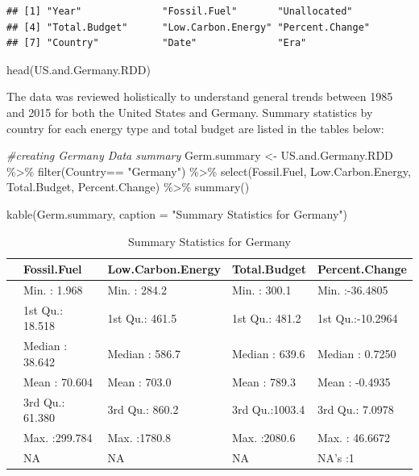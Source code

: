 \documentclass[
  12pt,
]{article}
\newenvironment{Shaded}{\begin{snugshade}}{\end{snugshade}}
\newcommand{\AttributeTok}[1]{\textcolor[rgb]{0.77,0.63,0.00}{#1}}
\newcommand{\CommentTok}[1]{\textcolor[rgb]{0.56,0.35,0.01}{\textit{#1}}}
\newcommand{\FunctionTok}[1]{\textcolor[rgb]{0.00,0.00,0.00}{#1}}
\newcommand{\NormalTok}[1]{#1}
\newcommand{\OtherTok}[1]{\textcolor[rgb]{0.56,0.35,0.01}{#1}}
\newcommand{\SpecialCharTok}[1]{\textcolor[rgb]{0.00,0.00,0.00}{#1}}
\newcommand{\StringTok}[1]{\textcolor[rgb]{0.31,0.60,0.02}{#1}}
\begin{document}
\begin{verbatim}
## [1] "Year"              "Fossil.Fuel"       "Unallocated"      
## [4] "Total.Budget"      "Low.Carbon.Energy" "Percent.Change"   
## [7] "Country"           "Date"              "Era"
\end{verbatim}

\begin{Shaded}
\begin{Highlighting}[]
\FunctionTok{head}\NormalTok{(US.and.Germany.RDD)}
\end{Highlighting}
\end{Shaded}

The data was reviewed holistically to understand general trends between
1985 and 2015 for both the United States and Germany. Summary statistics
by country for each energy type and total budget are listed in the
tables below:

\begin{Shaded}
\begin{Highlighting}[]
\CommentTok{\#creating Germany Data summary}
\NormalTok{Germ.summary }\OtherTok{\textless{}{-}}\NormalTok{ US.and.Germany.RDD }\SpecialCharTok{\%\textgreater{}\%}
  \FunctionTok{filter}\NormalTok{(Country}\SpecialCharTok{==} \StringTok{"Germany"}\NormalTok{) }\SpecialCharTok{\%\textgreater{}\%}
  \FunctionTok{select}\NormalTok{(Fossil.Fuel, Low.Carbon.Energy, Total.Budget, Percent.Change) }\SpecialCharTok{\%\textgreater{}\%}
  \FunctionTok{summary}\NormalTok{()}

\FunctionTok{kable}\NormalTok{(Germ.summary, }\AttributeTok{caption =} \StringTok{"Summary Statistics for Germany"}\NormalTok{)}
\end{Highlighting}
\end{Shaded}

\begin{table}

\caption{\label{tab:calculating the summary statistics for US and Germany and creating tables}Summary Statistics for Germany}
\centering
\begin{tabular}[t]{l|l|l|l|l}
\hline
  &  Fossil.Fuel & Low.Carbon.Energy &  Total.Budget & Percent.Change\\
\hline
 & Min.   :  1.968 & Min.   : 284.2 & Min.   : 300.1 & Min.   :-36.4805\\
\hline
 & 1st Qu.: 18.518 & 1st Qu.: 461.5 & 1st Qu.: 481.2 & 1st Qu.:-10.2964\\
\hline
 & Median : 38.642 & Median : 586.7 & Median : 639.6 & Median :  0.7250\\
\hline
 & Mean   : 70.604 & Mean   : 703.0 & Mean   : 789.3 & Mean   : -0.4935\\
\hline
 & 3rd Qu.: 61.380 & 3rd Qu.: 860.2 & 3rd Qu.:1003.4 & 3rd Qu.:  7.0978\\
\hline
 & Max.   :299.784 & Max.   :1780.8 & Max.   :2080.6 & Max.   : 46.6672\\
\hline
 & NA & NA & NA & NA's   :1\\
\hline
\end{tabular}
\end{table}
\end{document}
